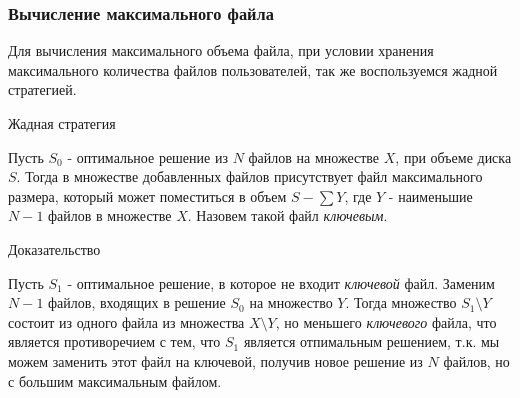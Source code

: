 \documentclass{beamer}
\begin{document}
\begin{frame}

    \frametitle{Вычисление максимального файла}

    { \footnotesize

    Для вычисления максимального объема файла, при условии хранения максимального количества файлов пользователей, так же воспользуемся \alert{жадной} стратегией.

    \pause

    \begin{alertblock}{Жадная стратегия}

        Пусть $S_0$ - оптимальное решение из $N$ файлов на множестве $X$, при объеме диска $S$. Тогда в множестве добавленных файлов присутствует файл максимального размера, который может поместиться в объем $S - \sum{Y}$, где $Y$ - наименьшие $N - 1$ файлов в множестве $X$. Назовем такой файл \emph{ключевым}.

    \end{alertblock}

    \pause

    \begin{block}{Доказательство}

        Пусть $S_1$ - оптимальное решение, в которое не входит \emph{ключевой} файл. Заменим $N - 1$ файлов, входящих в решение $S_0$ на множество $Y$. Тогда множество $S_1 \setminus Y$ состоит из одного файла из множества $X \setminus Y$, но меньшего \emph{ключевого} файла, что является противоречием с тем, что $S_1$ является отпимальным решением, т.к. мы можем заменить этот файл на ключевой, получив новое решение из $N$ файлов, но с большим максимальным файлом.

    \end{block}

    }

\end{frame}
\end{document}
